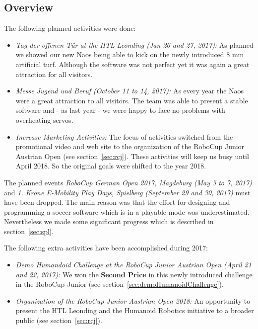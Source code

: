 \documentclass[11pt]{article}
\begin{document}
\subsection{Overview}
The following planned activities were done:
\begin{itemize}
	\item {\em Tag der offenen Tür at the HTL Leonding (Jan 26 and 27, 2017):}  As planned we showed our new Naos being able to kick on the newly introduced 8 mm artificial turf. Although the software was not perfect yet it was again a great attraction for all visitors.
		
	\item {\em Messe Jugend und Beruf (October 11 to 14, 2017):}  As every year the Naos were a great attraction to all visitors. The team was able to present a stable software and - as last year - we were happy to face no problems with overheating servos.
	
	\item {\em Increase Marketing Activities:} The focus of activities switched from the promotional video and web site to the organization of the RoboCup Junior Austrian Open (see section~\ref{sec:rcj}). These activities will keep us busy until April 2018. So the original goals were shifted to the year 2018.
\end{itemize}

The planned events {\em RoboCup German Open 2017, Magdeburg (May 5 to 7, 2017)} and  {\em 1. Krone E-Mobility Play Days, Spielberg (September 29 and 30, 2017)} must have been dropped. The main reason was that the effort for designing and programming a soccer software which is in a playable mode was underestimated. Nevertheless we made some significant progress which is described in section~\ref{sec:spl}.

The following extra activities have been accomplished during 2017:

\begin{itemize}
	\item {\em Demo Humandoid Challenge at the RoboCup Junior Austrian Open (April 21 and 22, 2017):} We won the {\bf Second Price} in this newly introduced challenge in the RoboCup Junior (see section~\ref{sec:demoHumanoidChallenge}).
	\item {\em Organization of the RoboCup Junior Austrian Open 2018:} An opportunity to present the HTL Leonding and the Humanoid Robotics initiative to a broader public (see section~\ref{sec:rcj}).
\end{itemize}
\end{document}
